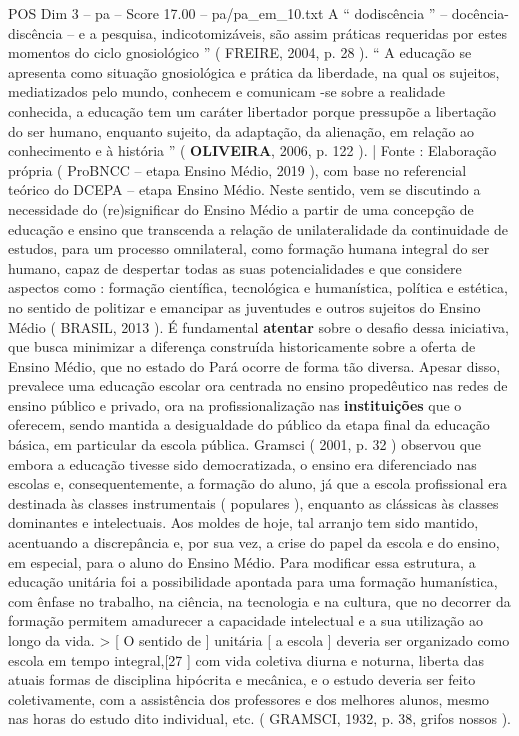 \begin{textsample}{POS Dim 3 – pa – Score 17.00 – pa/pa\_em\_10.txt}
A “ dodiscência ” – docência-discência – e a pesquisa, indicotomizáveis, são assim práticas requeridas por estes momentos do ciclo gnosiológico ” ( FREIRE, 2004, p. 28 ). “ A educação se apresenta como situação gnosiológica e prática da liberdade, na qual os sujeitos, mediatizados pelo mundo, conhecem e comunicam -se sobre a realidade conhecida, a educação tem um caráter libertador porque pressupõe a libertação do ser humano, enquanto sujeito, da adaptação, da alienação, em relação ao conhecimento e à história ” ( \textbf{OLIVEIRA}, 2006, p. 122 ). | Fonte : Elaboração própria ( ProBNCC – etapa Ensino Médio, 2019 ), com base no referencial teórico do DCEPA – etapa Ensino Médio.
Neste sentido, vem se discutindo a necessidade do (re)significar do Ensino Médio a partir de uma concepção de educação e ensino que transcenda a relação de unilateralidade da continuidade de estudos, para um processo omnilateral, como formação humana integral do ser humano, capaz de despertar todas as suas potencialidades e que considere aspectos como : formação científica, tecnológica e humanística, política e estética, no sentido de politizar e emancipar as juventudes e outros sujeitos do Ensino Médio ( BRASIL, 2013 ).
É fundamental \textbf{atentar} sobre o desafio dessa iniciativa, que busca minimizar a diferença construída historicamente sobre a oferta de Ensino Médio, que no estado do Pará ocorre de forma tão diversa.
Apesar disso, prevalece uma educação escolar ora centrada no ensino propedêutico nas redes de ensino público e privado, ora na profissionalização nas \textbf{instituições} que o oferecem, sendo mantida a desigualdade do público da etapa final da educação básica, em particular da escola pública.
Gramsci ( 2001, p. 32 ) observou que embora a educação tivesse sido democratizada, o ensino era diferenciado nas escolas e, consequentemente, a formação do aluno, já que a escola profissional era destinada às classes instrumentais ( populares ), enquanto as clássicas às classes dominantes e intelectuais.
Aos moldes de hoje, tal arranjo tem sido mantido, acentuando a discrepância e, por sua vez, a crise do papel da escola e do ensino, em especial, para o aluno do Ensino Médio.
Para modificar essa estrutura, a educação unitária foi a possibilidade apontada para uma formação humanística, com ênfase no trabalho, na ciência, na tecnologia e na cultura, que no decorrer da formação permitem amadurecer a capacidade intelectual e a sua utilização ao longo da vida. > [ O sentido de ] unitária [ a escola ] deveria ser organizado como escola em tempo integral,[27 ] com vida coletiva diurna e noturna, liberta das atuais formas de disciplina hipócrita e mecânica, e o estudo deveria ser feito coletivamente, com a assistência dos professores e dos melhores alunos, mesmo nas horas do estudo dito individual, etc. ( GRAMSCI, 1932, p. 38, grifos nossos ).

\end{textsample}
